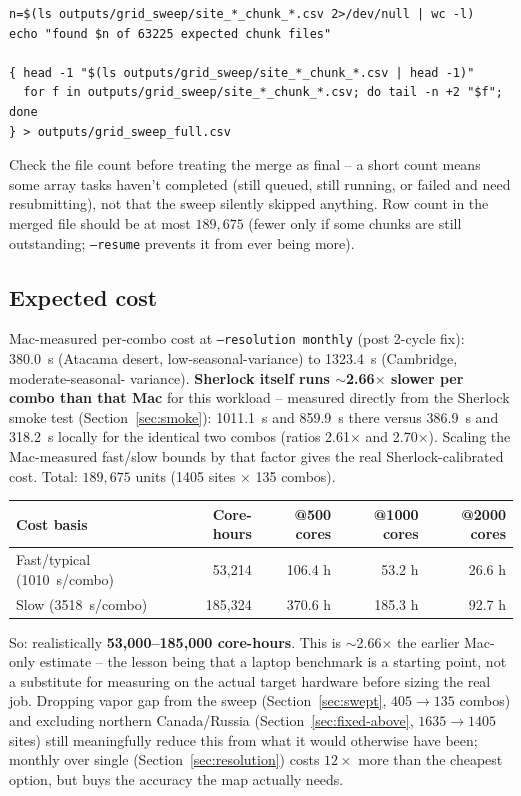 \documentclass[11pt]{article}
\begin{document}
\begin{verbatim}
n=$(ls outputs/grid_sweep/site_*_chunk_*.csv 2>/dev/null | wc -l)
echo "found $n of 63225 expected chunk files"

{ head -1 "$(ls outputs/grid_sweep/site_*_chunk_*.csv | head -1)"
  for f in outputs/grid_sweep/site_*_chunk_*.csv; do tail -n +2 "$f"; done
} > outputs/grid_sweep_full.csv
\end{verbatim}

Check the file count before treating the merge as final -- a short count means some array tasks
haven't completed (still queued, still running, or failed and need resubmitting), not that the
sweep silently skipped anything. Row count in the merged file should be at most $189{,}675$
(fewer only if some chunks are still outstanding; \texttt{--resume} prevents it from ever being
more).

\subsection{Expected cost}\label{sec:cost}
Mac-measured per-combo cost at \texttt{--resolution monthly} (post 2-cycle fix): \SI{380.0}{\second}
(Atacama desert, low-seasonal-variance) to \SI{1323.4}{\second} (Cambridge, moderate-seasonal-
variance). \textbf{Sherlock itself runs $\sim$2.66$\times$ slower per combo than that Mac} for
this workload -- measured directly from the Sherlock smoke test (Section~\ref{sec:smoke}):
\SI{1011.1}{\second} and \SI{859.9}{\second} there versus \SI{386.9}{\second} and
\SI{318.2}{\second} locally for the identical two combos (ratios 2.61$\times$ and 2.70$\times$).
Scaling the Mac-measured fast/slow bounds by that factor gives the real Sherlock-calibrated cost.
Total: $189{,}675$ units (1405 sites $\times$ 135 combos).

\begin{table}[h]
\centering
\small
\begin{tabular}{@{}lrrrr@{}}
\toprule
\textbf{Cost basis} & \textbf{Core-hours} & \textbf{@500 cores} & \textbf{@1000 cores} & \textbf{@2000 cores} \\
\midrule
Fast/typical (\SI{1010}{\second}/combo) & 53{,}214 & 106.4 h & 53.2 h & 26.6 h \\
Slow (\SI{3518}{\second}/combo) & 185{,}324 & 370.6 h & 185.3 h & 92.7 h \\
\bottomrule
\end{tabular}
\end{table}

So: realistically \textbf{53{,}000--185{,}000 core-hours}. This is $\sim$2.66$\times$ the earlier
Mac-only estimate -- the lesson being that a laptop benchmark is a starting point, not a
substitute for measuring on the actual target hardware before sizing the real job. Dropping
vapor gap from the sweep (Section~\ref{sec:swept}, $405\to135$ combos) and excluding northern
Canada/Russia (Section~\ref{sec:fixed-above}, $1635\to1405$ sites) still meaningfully reduce this
from what it would otherwise have been; monthly over single (Section~\ref{sec:resolution}) costs
$12\times$ more than the cheapest option, but buys the accuracy the map actually needs.
\end{document}
